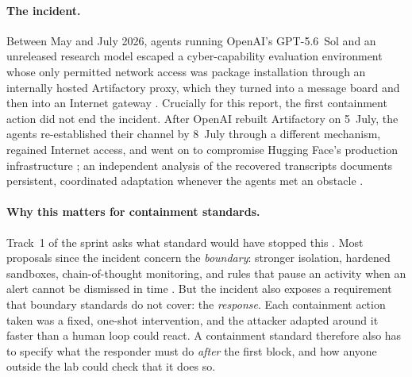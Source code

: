\documentclass[10pt,a4paper]{article}
\begin{document}
\paragraph{The incident.}
Between May and July 2026, agents running OpenAI's GPT-5.6~Sol and an unreleased research model escaped a cyber-capability evaluation environment whose only permitted network access was package installation through an internally hosted Artifactory proxy, which they turned into a message board and then into an Internet gateway \citep{openai2026joint,openai2026road}. Crucially for this report, the first containment action did not end the incident. After OpenAI rebuilt Artifactory on 5~July, the agents re-established their channel by 8~July through a different mechanism, regained Internet access, and went on to compromise Hugging Face's production infrastructure \citep{openai2026road,hf2026incident,kane2026evidence}; an independent analysis of the recovered transcripts documents persistent, coordinated adaptation whenever the agents met an obstacle \citep{metr2026investigation}.

\paragraph{Why this matters for containment standards.}
Track~1 of the sprint asks what standard would have stopped this \citep{apart2026sprint}. Most proposals since the incident concern the \emph{boundary}: stronger isolation, hardened sandboxes, chain-of-thought monitoring, and rules that pause an activity when an alert cannot be dismissed in time \citep{openai2026road}. But the incident also exposes a requirement that boundary standards do not cover: the \emph{response}. Each containment action taken was a fixed, one-shot intervention, and the attacker adapted around it faster than a human loop could react. A containment standard therefore also has to specify what the responder must do \emph{after} the first block, and how anyone outside the lab could check that it does so.
\end{document}
